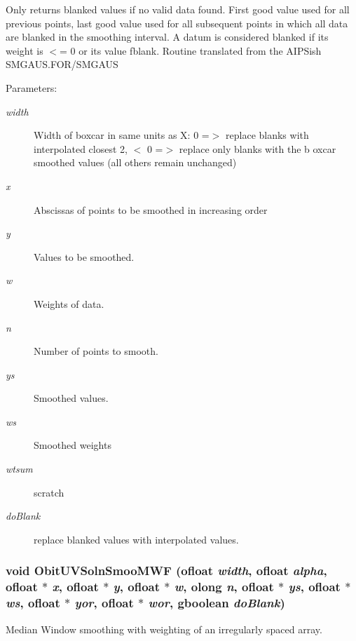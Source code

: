 Only returns blanked values if no valid data found. First good value used for all previous points, last good value used for all subsequent points in which all data are blanked in the smoothing interval. A datum is considered blanked if its weight is $<$= 0 or its value fblank. Routine translated from the AIPSish SMGAUS.FOR/SMGAUS \begin{Desc}
\item[Parameters:]
\begin{description}
\item[{\em width}]Width of boxcar in same units as X: 0 =$>$ replace blanks with interpolated closest 2, $<$ 0 =$>$ replace only blanks with the b oxcar smoothed values (all others remain unchanged) \item[{\em x}]Abscissas of points to be smoothed in increasing order \item[{\em y}]Values to be smoothed. \item[{\em w}]Weights of data. \item[{\em n}]Number of points to smooth. \item[{\em ys}]Smoothed values. \item[{\em ws}]Smoothed weights \item[{\em wtsum}]scratch \item[{\em do\-Blank}]replace blanked values with interpolated values. \end{description}
\end{Desc}
\subsubsection{\setlength{\rightskip}{0pt plus 5cm}void Obit\-UVSoln\-Smoo\-MWF ({\bf ofloat} {\em width}, {\bf ofloat} {\em alpha}, {\bf ofloat} $\ast$ {\em x}, {\bf ofloat} $\ast$ {\em y}, {\bf ofloat} $\ast$ {\em w}, {\bf olong} {\em n}, {\bf ofloat} $\ast$ {\em ys}, {\bf ofloat} $\ast$ {\em ws}, {\bf ofloat} $\ast$ {\em yor}, {\bf ofloat} $\ast$ {\em wor}, gboolean {\em do\-Blank})}\label{ObitUVSoln_8c_a34}


Median Window smoothing with weighting of an irregularly spaced array. 

